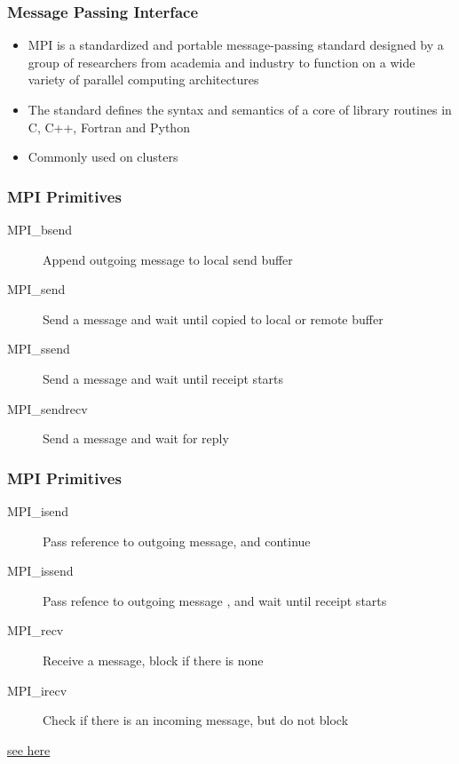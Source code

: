 \documentclass{beamer}
\begin{document}
      \begin{frame}
      	\frametitle{Message Passing Interface}
      	\begin{itemize}
      		\item MPI is a standardized and portable message-passing standard designed by a group of researchers from academia and industry to function on a wide variety of parallel computing architectures
      		\item The standard defines the syntax and semantics of a core of library routines in C, C++, Fortran and Python
      		\item Commonly used on clusters 
      	\end{itemize}
      \end{frame}
      \begin{frame}
      	\frametitle{MPI Primitives}
      	\begin{description}
      		\item[MPI\_bsend] Append outgoing message to local send buffer
      		\item[MPI\_send] Send a message and wait until copied to local or remote buffer
      		\item[MPI\_ssend] Send a message and wait until receipt starts
      		\item[MPI\_sendrecv] Send a message and wait for reply
      	\end{description}
      \end{frame}
            \begin{frame}
            	\frametitle{MPI Primitives}
            	\begin{description}
            		\item[MPI\_isend] Pass reference to outgoing message, and continue
            		\item[MPI\_issend] Pass refence to outgoing message , and wait until receipt starts
            		\item[MPI\_recv] Receive a message, block if there is none
            		\item[MPI\_irecv] Check if there is an incoming message, but do not block
            	\end{description}
            	\href{http://materials.jeremybejarano.com/MPIwithPython/introMPI.html}{see here}
            \end{frame}
\end{document}
